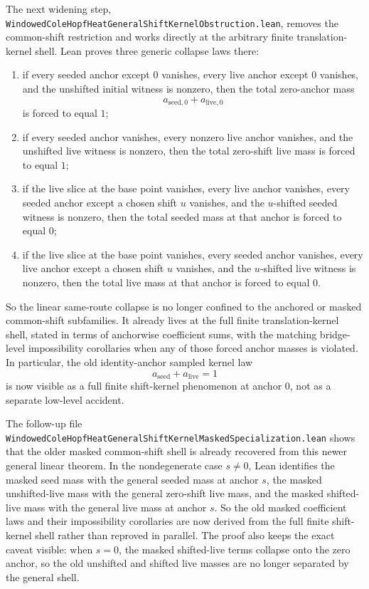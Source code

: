 \documentclass[11pt]{article}
\begin{document}
The next widening step,
\texttt{WindowedColeHopfHeatGeneralShiftKernelObstruction.lean}, removes the
common-shift restriction and works directly at the arbitrary finite
translation-kernel shell.  Lean proves three generic collapse laws there:
\begin{enumerate}[leftmargin=1.5em]
  \item if every seeded anchor except \(0\) vanishes, every live anchor except
  \(0\) vanishes, and the unshifted initial witness is nonzero, then the total
  zero-anchor mass
  \[
    a_{\mathrm{seed},0} + a_{\mathrm{live},0}
  \]
  is forced to equal \(1\);
  \item if every seeded anchor vanishes, every nonzero live anchor vanishes,
  and the unshifted live witness is nonzero, then the total zero-shift live
  mass is forced to equal \(1\);
  \item if the live slice at the base point vanishes, every live anchor
  vanishes, every seeded anchor except a chosen shift \(u\) vanishes, and the
  \(u\)-shifted seeded witness is nonzero, then the total seeded mass at that
  anchor is forced to equal \(0\);
  \item if the live slice at the base point vanishes, every seeded anchor
  vanishes, every live anchor except a chosen shift \(u\) vanishes, and the
  \(u\)-shifted live witness is nonzero, then the total live mass at that
  anchor is forced to equal \(0\).
\end{enumerate}
So the linear same-route collapse is no longer confined to the anchored or
masked common-shift subfamilies.  It already lives at the full finite
translation-kernel shell, stated in terms of anchorwise coefficient sums, with
the matching bridge-level impossibility corollaries when any of those forced
anchor masses is violated.  In particular, the old identity-anchor sampled
kernel law
\[
  a_{\mathrm{seed}} + a_{\mathrm{live}} = 1
\]
is now visible as a full finite shift-kernel phenomenon at anchor \(0\), not
as a separate low-level accident.

The follow-up file
\texttt{WindowedColeHopfHeatGeneralShiftKernelMaskedSpecialization.lean}
shows that the older masked common-shift shell is already recovered from this
newer general linear theorem.  In the nondegenerate case \(s \neq 0\), Lean
identifies the masked seed mass with the general seeded mass at anchor \(s\),
the masked unshifted-live mass with the general zero-shift live mass, and the
masked shifted-live mass with the general live mass at anchor \(s\).  So the
old masked coefficient laws and their impossibility corollaries are now
derived from the full finite shift-kernel shell rather than reproved in
parallel.  The proof also keeps the exact caveat visible: when \(s = 0\), the
masked shifted-live terms collapse onto the zero anchor, so the old unshifted
and shifted live masses are no longer separated by the general shell.
\end{document}
